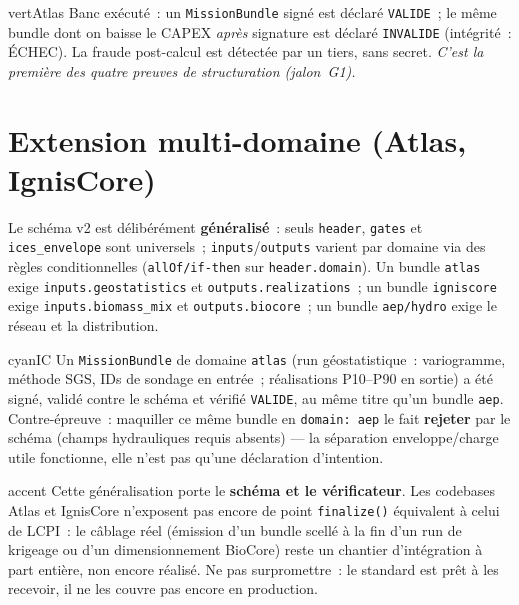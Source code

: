 \documentclass[11pt,a4paper]{article}
\begin{document}
\begin{icesbox}{vertAtlas}
Banc exécuté~: un \texttt{MissionBundle} signé est déclaré \texttt{VALIDE}~; le même bundle dont
on baisse le CAPEX \emph{après} signature est déclaré \texttt{INVALIDE} (intégrité~: ÉCHEC). La
fraude post-calcul est détectée par un tiers, sans secret. \textit{C'est la première des quatre
preuves de structuration (jalon~G1).}
\end{icesbox}

\section{Extension multi-domaine (Atlas, IgnisCore)}
Le schéma v2 est délibérément \textbf{généralisé}~: seuls \texttt{header}, \texttt{gates} et
\texttt{ices\_envelope} sont universels~; \texttt{inputs}/\texttt{outputs} varient par domaine
via des règles conditionnelles (\texttt{allOf/if-then} sur \texttt{header.domain}). Un bundle
\texttt{atlas} exige \texttt{inputs.geostatistics} et \texttt{outputs.realizations}~; un bundle
\texttt{igniscore} exige \texttt{inputs.biomass\_mix} et \texttt{outputs.biocore}~; un bundle
\texttt{aep/hydro} exige le réseau et la distribution.

\begin{icesbox}{cyanIC}
Un \texttt{MissionBundle} de domaine \texttt{atlas} (run géostatistique~: variogramme, méthode
SGS, IDs de sondage en entrée~; réalisations P10--P90 en sortie) a été signé, validé contre le
schéma et vérifié \texttt{VALIDE}, au même titre qu'un bundle \texttt{aep}. Contre-épreuve~:
maquiller ce même bundle en \texttt{domain: aep} le fait \textbf{rejeter} par le schéma (champs
hydrauliques requis absents) — la séparation enveloppe/charge utile fonctionne, elle n'est pas
qu'une déclaration d'intention.
\end{icesbox}

\begin{icesbox}{accent}
Cette généralisation porte le \textbf{schéma et le vérificateur}. Les codebases Atlas et
IgnisCore n'exposent pas encore de point \texttt{finalize()} équivalent à celui de LCPI~: le
câblage réel (émission d'un bundle scellé à la fin d'un run de krigeage ou d'un dimensionnement
BioCore) reste un chantier d'intégration à part entière, non encore réalisé. Ne pas
surpromettre~: le standard est prêt à les recevoir, il ne les couvre pas encore en production.
\end{icesbox}
\end{document}
